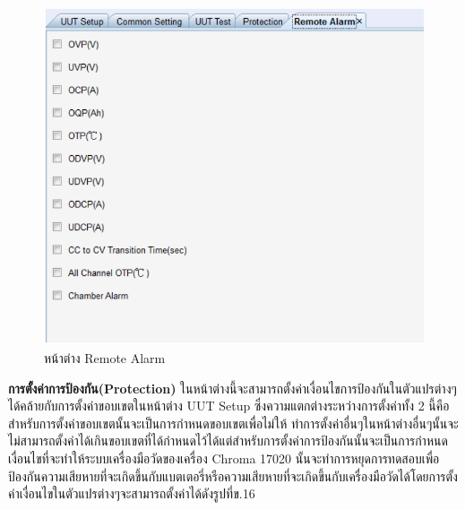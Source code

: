 \begin{center}
	\begin{figure}[H]
		\includegraphics[width=1\linewidth]{Chapters/img/17020_Program/Recipe_Editor/setting_remote_alarm.png}
		\centering
		\captionsetup{justification=centering,margin=2cm}
		\caption{หน้าต่าง Remote Alarm}
	\end{figure}
\end{center}
\textbf{การตั้งค่าการป้องกัน(Protection)}
\newline \hspace*{2cm}
ในหน้าต่างนี้จะสามารถตั้งค่าเงื่อนไขการป้องกันในตัวแปรต่างๆได้คล้ายกับการตั้งค่าขอบเขตในหน้าต่าง UUT Setup ซึ่งความแตกต่างระหว่างการตั้งค่าทั้ง 2 นี้คือสำหรับการตั้งค่าขอบเขตนั้นจะเป็นการกำหนดขอบเขตเพื่อไม่ให้
ทำการตั้งค่าอื่นๆในหน้าต่างอื่นๆนั้นจะไม่สามารถตั้งค่าได้เกินขอบเขตที่ได้กำหนดไว้ได้แต่สำหรับการตั้งค่าการป้องกันนั้นจะเป็นการกำหนดเงื่อนไขที่จะทำให้ระบบเครื่องมือวัดของเครื่อง Chroma 17020 นั้นจะทำการหยุดการทดสอบเพื่อ
ป้องกันความเสียหายที่จะเกิดขึ้นกับแบตเตอรี่หรือความเสียหายที่จะเกิดขึ้นกับเครื่องมือวัดได้โดยการตั้งค่าเงื่อนไขในตัวแปรต่างๆจะสามารถตั้งค่าได้ดังรูปที่ข.16

